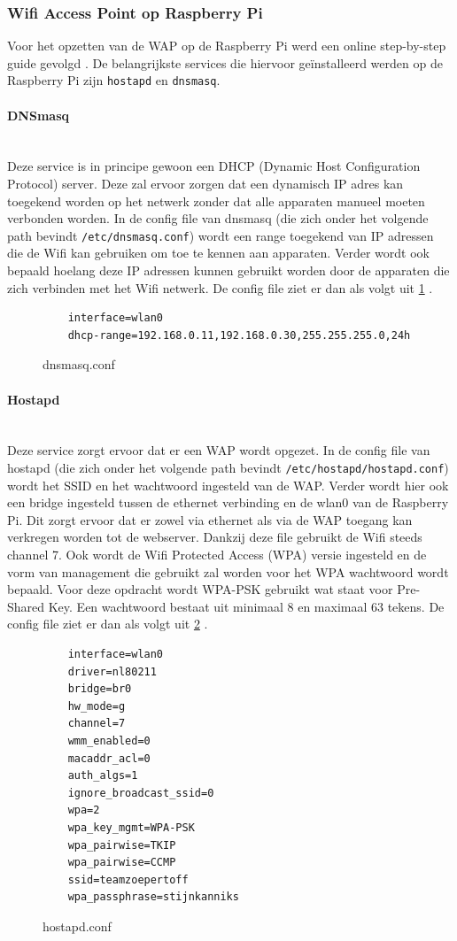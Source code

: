 \documentclass[a4paper,kul]{kulakarticle} %
\begin{document}
\subsubsection{Wifi Access Point op Raspberry Pi}
Voor het opzetten van de WAP op de Raspberry Pi werd een online step-by-step guide gevolgd \cite{RaspberryPiWAP}. De belangrijkste services die hiervoor geïnstalleerd werden op de Raspberry Pi zijn \verb|hostapd| en \verb|dnsmasq|.
\paragraph{DNSmasq} \mbox{}\\ 
Deze service is in principe gewoon een DHCP (Dynamic Host Configuration Protocol) server. Deze zal ervoor zorgen dat een dynamisch IP adres kan toegekend worden op het netwerk zonder dat alle apparaten manueel moeten verbonden worden. In de config file van dnsmasq (die zich onder het volgende path bevindt \verb|/etc/dnsmasq.conf|) wordt een range toegekend van IP adressen die de Wifi kan gebruiken om toe te kennen aan apparaten. Verder wordt ook bepaald hoelang deze IP adressen kunnen gebruikt worden door de apparaten die zich verbinden met het Wifi netwerk. De config file ziet er dan als volgt uit \ref{fig:dnsmasq} .
\begin{figure}[!h]
	\begin{verbatim}
	interface=wlan0
	dhcp-range=192.168.0.11,192.168.0.30,255.255.255.0,24h
	\end{verbatim}
	\caption{dnsmasq.conf}
	\label{fig:dnsmasq}
\end{figure}
\paragraph{Hostapd} \mbox{}\\
Deze service zorgt ervoor dat er een WAP wordt opgezet. In de config file van hostapd (die zich onder het volgende path bevindt \verb|/etc/hostapd/hostapd.conf|) wordt het SSID en het wachtwoord ingesteld van de WAP. Verder wordt hier ook een bridge ingesteld tussen de ethernet verbinding en de wlan0 van de Raspberry Pi. Dit zorgt ervoor dat er zowel via ethernet als via de WAP toegang kan verkregen worden tot de webserver. Dankzij deze file gebruikt de Wifi steeds channel 7. Ook wordt de Wifi Protected Access (WPA) versie ingesteld en de vorm van management die gebruikt zal worden voor het WPA wachtwoord wordt bepaald. Voor deze opdracht wordt WPA-PSK gebruikt wat staat voor Pre-Shared Key. Een wachtwoord bestaat uit minimaal 8 en maximaal 63 tekens. De config file ziet er dan als volgt uit \ref{fig:hostapd} .
\begin{figure}[!h]
	\begin{verbatim}
	interface=wlan0
	driver=nl80211
	bridge=br0
	hw_mode=g
	channel=7
	wmm_enabled=0
	macaddr_acl=0
	auth_algs=1
	ignore_broadcast_ssid=0
	wpa=2
	wpa_key_mgmt=WPA-PSK
	wpa_pairwise=TKIP
	wpa_pairwise=CCMP
	ssid=teamzoepertoff
	wpa_passphrase=stijnkanniks
	\end{verbatim}
	\caption{hostapd.conf}
	\label{fig:hostapd}
\end{figure}
\newpage
\end{document}
